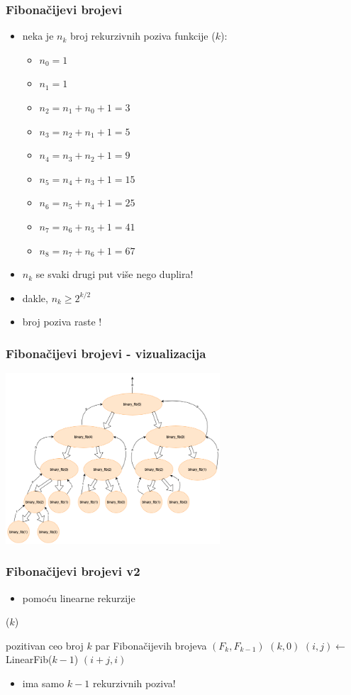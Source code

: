 \documentclass[compress,aspectratio=169]{beamer}
\begin{document}
\begin{frame}[fragile]
  \frametitle{Fibonačijevi brojevi}
\begin{itemize}
  \item neka je $n_k$ broj rekurzivnih poziva funkcije ($k$):
  \begin{itemize}
    \item $n_0 = 1$
    \item $n_1 = 1$
    \item $n_2 = n_1 + n_0 + 1 = 3$
    \item $n_3 = n_2 + n_1 + 1 = 5$
    \item $n_4 = n_3 + n_2 + 1 = 9$
    \item $n_5 = n_4 + n_3 + 1 = 15$
    \item $n_6 = n_5 + n_4 + 1 = 25$
    \item $n_7 = n_6 + n_5 + 1 = 41$
    \item $n_8 = n_7 + n_6 + 1 = 67$
  \end{itemize}
  \item $n_k$ se svaki drugi put više nego duplira!
  \item dakle, $n_k \geq 2^{k/2}$
  \item broj poziva raste !
\end{itemize}
\end{frame}

\begin{frame}[fragile]
	\frametitle{Fibonačijevi brojevi - vizualizacija}
	\begin{center}
		\includegraphics[width=8cm]{asp-02-pic10}
	\end{center}
	\end{frame}

\begin{frame}[fragile]
  \frametitle{Fibonačijevi brojevi v2}
\begin{itemize}
  \item pomoću linearne rekurzije
\end{itemize}
($k$)
\begin{algorithmic}
\REQUIRE pozitivan ceo broj $k$
\ENSURE par Fibonačijevih brojeva $(F_k, F_{k-1})$
  \RETURN $(k, 0)$
\ELSE
  \STATE $(i, j) \leftarrow$ LinearFib($k-1$)
  \RETURN $(i+j, i)$
\ENDIF
\end{algorithmic}
\begin{itemize}
  \item ima samo $k-1$ rekurzivnih poziva!
\end{itemize}
\end{frame}
\end{document}
